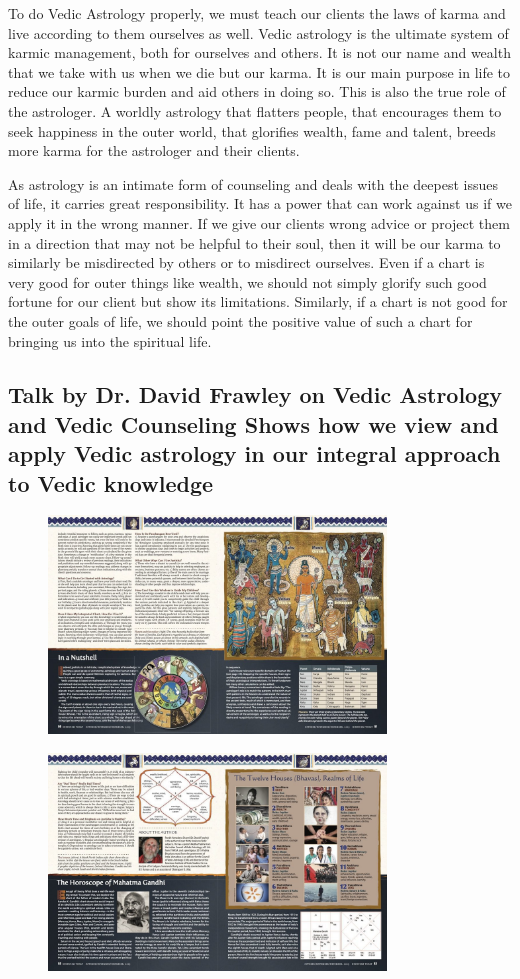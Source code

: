  

To do Vedic Astrology properly, we must teach our clients the laws of karma and live according to them ourselves as well. Vedic astrology is the ultimate system of karmic management, both for ourselves and others. It is not our name and wealth that we take with us when we die but our karma. It is our main purpose in life to reduce our karmic burden and aid others in doing so. This is also the true role of the astrologer. A worldly astrology that flatters people, that encourages them to seek happiness in the outer world, that glorifies wealth, fame and talent, breeds more karma for the astrologer and their clients.

 

As astrology is an intimate form of counseling and deals with the deepest issues of life, it carries great responsibility. It has a power that can work against us if we apply it in the wrong manner. If we give our clients wrong advice or project them in a direction that may not be helpful to their soul, then it will be our karma to similarly be misdirected by others or to misdirect ourselves. Even if a chart is very good for outer things like wealth, we should not simply glorify such good fortune for our client but show its limitations. Similarly, if a chart is not good for the outer goals of life, we should point the positive value of such a chart for bringing us into the spiritual life.

 


\subsection{\textbf{Talk by Dr. David Frawley on Vedic Astrology and Vedic Counseling
Shows how we view and apply Vedic astrology in our integral approach to Vedic knowledge}}

\begin{figure}[H]
 \centering
\includegraphics[width=0.8\textwidth]{pics/overview1.png}
 \end{figure}

\begin{figure}[H]
 \centering
\includegraphics[width=0.8\textwidth]{pics/overview2.png}
 \end{figure}

